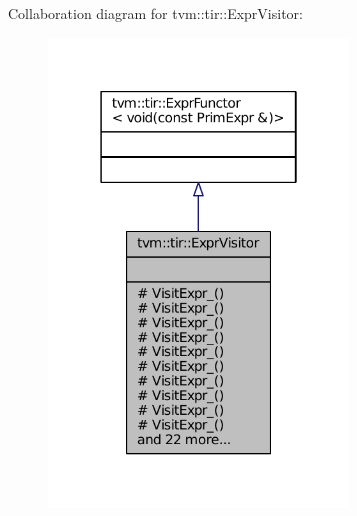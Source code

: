 Collaboration diagram for tvm\+:\+:tir\+:\+:Expr\+Visitor\+:
\nopagebreak
\begin{figure}[H]
\begin{center}
\leavevmode
\includegraphics[width=226pt]{classtvm_1_1tir_1_1ExprVisitor__coll__graph}
\end{center}
\end{figure}
